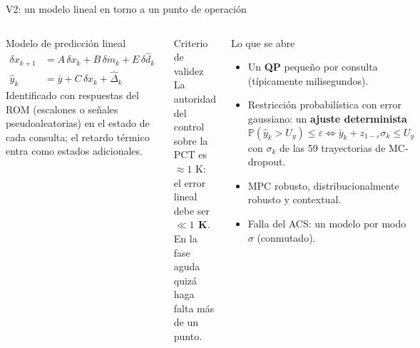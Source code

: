 \documentclass[aspectratio=169,10pt]{beamer}
\newcommand{\key}[1]{{\color{USMBlue}\bfseries #1}}
\newcommand{\yhat}{\hat y}
\newcommand{\Prob}{\mathbb P}
\begin{document}
\begin{frame}{V2: un modelo lineal en torno a un punto de operación}
\begin{columns}[T]
\begin{block}{Modelo de predicción lineal}
\vspace{-.2cm}
\begin{align*}
\delta x_{k+1}&=A\,\delta x_k+B\,\delta\dot m_k+E\,\delta\hat d_k\\
\yhat_k&=\bar y+C\,\delta x_k+\hat\Delta_k
\end{align*}
\small Identificado con respuestas del ROM (escalones o señales pseudoaleatorias) en el estado de cada consulta; el retardo térmico entra como estados adicionales.
\end{block}
\begin{alertblock}{Criterio de validez}
\small La autoridad del control sobre la PCT es $\approx 1$ K: el error lineal debe ser \key{$\ll 1$ K}. En la fase aguda quizá haga falta más de un punto.
\end{alertblock}
\begin{exampleblock}{Lo que se abre}
\small
\begin{itemize}\setlength{\itemsep}{.06cm}
\item Un \key{QP} pequeño por consulta (típicamente milisegundos).
\item Restricción probabilística con error gaussiano: un \key{ajuste determinista}
\[
\Prob(\yhat_k>U_y)\leq\varepsilon\iff \bar y_k+z_{1-\varepsilon}\sigma_k\leq U_y
\]
con $\sigma_k$ de las 59 trayectorias de MC-dropout.
\item MPC robusto, distribucionalmente robusto y contextual.
\item Falla del ACS: un modelo por modo $\sigma$ (conmutado).
\end{itemize}
\end{exampleblock}
\end{columns}
\end{frame}
\end{document}
